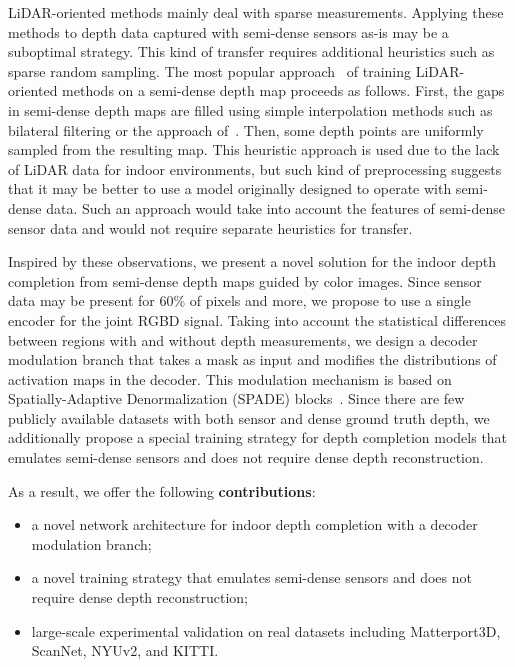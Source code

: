 \documentclass[final]{cvpr}
\begin{document}
    LiDAR-oriented methods mainly deal with sparse measurements.
    Applying these methods to depth data captured with semi-dense sensors as-is may be a suboptimal strategy. This kind of transfer requires additional heuristics such as sparse random sampling. The most popular approach~\cite{guidenet, deeplidar, Cheng_2018_ECCV, Ma2017SparseToDense} 
of training LiDAR-oriented methods on a semi-dense depth map proceeds as follows. First, the gaps in semi-dense depth maps are filled using simple interpolation methods such as bilateral filtering or the approach of~\cite{levin}. Then, some depth points are uniformly sampled from the resulting map. This heuristic approach is used due to the lack of LiDAR data for indoor environments, but such kind of preprocessing suggests that it may be better to use a model originally designed to operate with semi-dense data. Such an approach would take into account the features of semi-dense sensor data and would not require separate heuristics for transfer.

    Inspired by these observations, we present a novel solution for the indoor depth completion from semi-dense depth maps guided by color images. Since sensor data may be present for 60\% of pixels and more, we propose to use a single encoder for the joint RGBD signal. Taking into account the statistical differences between regions with and without depth measurements, we design a decoder modulation branch that takes a mask as input and modifies the distributions of activation maps in the decoder. This modulation mechanism is based on Spatially-Adaptive Denormalization (SPADE) blocks~\cite{spade}.
Since there are few publicly available datasets with both sensor and dense ground truth depth, we additionally propose a special training strategy for depth completion models that emulates semi-dense sensors and does not require dense depth reconstruction. 
    
    As a result, we offer the following \textbf{contributions}:
    \begin{itemize}
        \item a novel network architecture for indoor depth completion with a decoder modulation branch;
        \item a novel training strategy that emulates semi-dense sensors and does not require dense depth reconstruction;
        \item large-scale experimental validation on real datasets including Matterport3D, ScanNet, NYUv2, and KITTI.
    \end{itemize}
    
\end{document}
